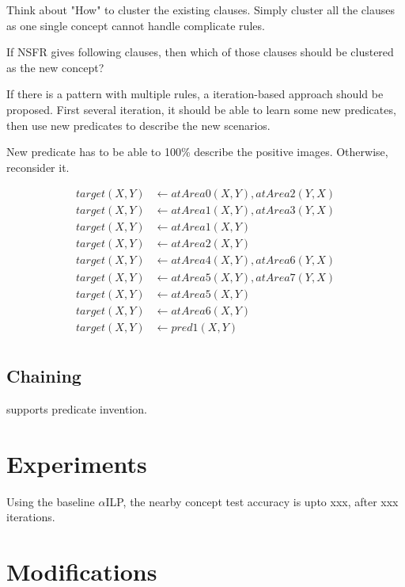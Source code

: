\documentclass[
]{ceurart}
\begin{document}
Think about "How" to cluster the existing clauses. Simply cluster all the clauses as one single concept cannot handle complicate rules.

If NSFR gives following clauses, then which of those clauses should be clustered as the new concept?

If there is a pattern with multiple rules,
a iteration-based approach should be proposed.
First several iteration, it should be able to learn some new predicates, then use new predicates to describe the new scenarios.

New predicate has to be able to 100\% describe the positive images. Otherwise, reconsider it.

\begin{align*}
	target(X,Y) &\leftarrow atArea0(X,Y), atArea2(Y,X)  \\
	target(X,Y) &\leftarrow atArea1(X,Y),atArea3(Y,X) \\
	target(X,Y) &\leftarrow atArea1(X,Y) \\    
	target(X,Y) &\leftarrow atArea2(X,Y) \\    
	target(X,Y) &\leftarrow atArea4(X,Y),atArea6(Y,X) \\
	target(X,Y) &\leftarrow atArea5(X,Y),atArea7(Y,X) \\
	target(X,Y) &\leftarrow atArea5(X,Y) \\    
	target(X,Y) &\leftarrow atArea6(X,Y) \\
	target(X,Y) &\leftarrow pred1(X,Y) \\
\end{align*}




\subsection{Chaining}
\cite{dILP} supports predicate invention.


\section{Experiments}

Using the baseline $\alpha$ILP, the nearby concept test accuracy is upto xxx, after xxx iterations.





\section{Modifications}
\end{document}
